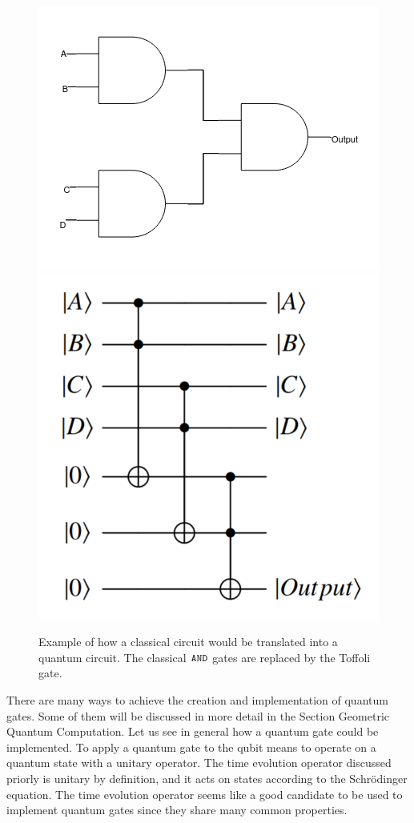 \begin{figure}[H]
\begin{center}
\includegraphics[scale=0.5]{figures/Andgates.png}
\includegraphics[scale=0.2]{figures/Qcircuit.png}
\caption{Example of how a classical circuit would be translated into a quantum circuit. The classical ${\tt AND}$ gates are replaced by the Toffoli gate.}
\end{center}
\end{figure}

There are many ways to achieve the creation and implementation of quantum gates. Some of them will be discussed in more detail in the Section Geometric Quantum Computation. Let us see in general how a quantum gate could be implemented. To apply a quantum gate to the qubit means to operate on a quantum state with a unitary operator. The time evolution operator discussed priorly is unitary by definition, and it acts on states according to the Schrödinger equation. The time evolution operator seems like a good candidate to be used to implement quantum gates since they share many common properties.


